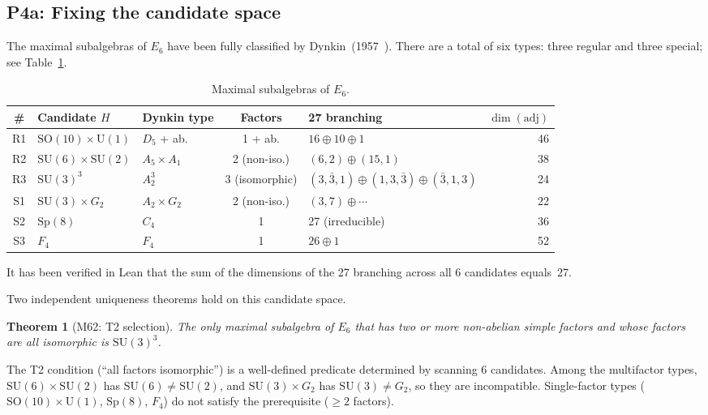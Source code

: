 \documentclass[sn-mathphys-num,Numbered]{sn-jnl}
\theoremstyle{thmstyleone}
\newtheorem{theorem}{Theorem}[section]
\theoremstyle{thmstylethree}
\newcommand{\SU}{\mathrm{SU}}
\newcommand{\SO}{\mathrm{SO}}
\newcommand{\Sp}{\mathrm{Sp}}
\newcommand{\U}{\mathrm{U}}
\newcommand{\adj}{\mathrm{adj}}
\begin{document}
\subsection{P4a: Fixing the candidate space}\label{sec:P4a}

The maximal subalgebras of $E_6$ have been fully classified by
Dynkin~(1957~\cite{Dynkin1957}).  There are a total of six types: three
regular and three special; see Table~\ref{tab:E6max}.

\begin{table}[htb]
\centering
\caption{Maximal subalgebras of $E_6$.}\label{tab:E6max}
\begin{tabular}{cllclr}
\toprule
\# & Candidate $H$ & Dynkin type & Factors & 27 branching & $\dim(\adj)$ \\
\midrule
R1 & $\SO(10) \times \U(1)$ & $D_5$ + ab. & 1 + ab. &
  $16 \oplus 10 \oplus 1$ & 46 \\
R2 & $\SU(6) \times \SU(2)$ & $A_5 \times A_1$ & 2 (non-iso.) &
  $(6,2) \oplus (15,1)$ & 38 \\
R3 & $\SU(3)^3$ & $A_2^3$ & 3 (isomorphic) &
  $(3,\bar{3},1) \oplus (1,3,\bar{3}) \oplus (\bar{3},1,3)$ & 24 \\
S1 & $\SU(3) \times G_2$ & $A_2 \times G_2$ & 2 (non-iso.) &
  $(3,7) \oplus \cdots$ & 22 \\
S2 & $\Sp(8)$ & $C_4$ & 1 & 27 (irreducible) & 36 \\
S3 & $F_4$ & $F_4$ & 1 & $26 \oplus 1$ & 52 \\
\bottomrule
\end{tabular}
\end{table}

It has been verified in Lean that the sum of the dimensions of the 27
branching across all 6 candidates equals~27.

Two independent uniqueness theorems hold on this candidate space.

\begin{theorem}[M62: T2 selection]\label{thm:M62}
The only maximal subalgebra of $E_6$ that has two or more non-abelian simple
factors and whose factors are all isomorphic is $\SU(3)^3$.
\end{theorem}

The T2 condition (``all factors isomorphic'') is a well-defined predicate
determined by scanning 6 candidates.  Among the multifactor types, $\SU(6)
\times \SU(2)$ has $\SU(6) \neq \SU(2)$, and $\SU(3) \times G_2$ has $\SU(3)
\neq G_2$, so they are incompatible.  Single-factor types ($\SO(10) \times
\U(1)$, $\Sp(8)$, $F_4$) do not satisfy the prerequisite ($\geq 2$ factors).
\end{document}
